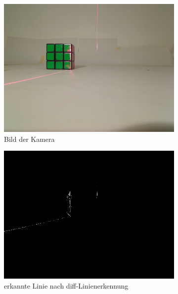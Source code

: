 \documentclass[ngerman,a4paper,parskip=half]{scrartcl}
\begin{document}
\begin{figure}[H]
	\begin{subfigure}{0.32\textwidth}
		\includegraphics[width=\textwidth]{includes/green_0.png}
		\caption{Bild der Kamera\\}
		\label{fig:green_0_cam}
	\end{subfigure}
	\hfill
	\begin{subfigure}{0.32\textwidth}
		\includegraphics[width=\textwidth]{includes/green_0_diff.png}
		\caption{erkannte Linie nach diff-Linienerkennung}
		\label{fig:green_0_diff}
	\end{subfigure}
	\hfill
	\begin{subfigure}{0.32\textwidth}

\end{subfigure}
\end{figure}
\end{document}
